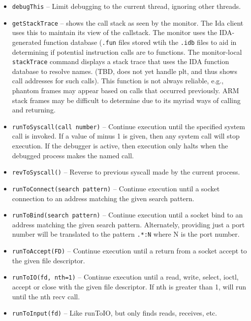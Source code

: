 \documentclass[titlepage]{article}
\begin{document}
\begin{itemize}
\item {\tt debugThis} -- Limit debugging to the current thread, ignoring other threads.

\item {\tt getStackTrace} – shows the call stack as seen by the monitor.  The Ida client uses this to maintain its view of the callstack.  The monitor
uses the IDA-generated function database ({\tt .fun} files stored wtih the {\tt .idb} files to aid in determining if 
potential instruction calls are to functions.  The monitor-local {\tt stackTrace} command displays a
stack trace that uses the IDA function database to resolve names.  (TBD, does not yet handle plt, and thus shows call addresses for such calls).
This function is not always reliable, e.g., phantom frames may appear based on calls that occurred previously. ARM stack frames may be
difficult to determine due to its myriad ways of calling and returning. 

\item {\tt runToSyscall(call number)} – Continue execution until the specified system call is invoked.  If a value of minus 1 is given, then any system call will stop execution.  If the debugger is active, then execution only halts when the debugged process makes the named call.

\item {\tt revToSyscall()} -- Reverse to previous syscall made by the current process.

\item {\tt runToConnect(search pattern)} – Continue execution until a socket connection to an address matching the given search pattern.

\item {\tt runToBind(search pattern)} – Continue execution until a socket bind to an address matching the given search pattern.  Alternately, providing just
a port number will be translated to the pattern {\tt .*:N} where N is the port number.

\item {\tt runToAccept(FD)} – Continue execution until a return from a socket accept to the given file descriptor.

\item {\tt runToIO(fd, nth=1)} – Continue execution until a read, write, select, ioctl, accept or close with the given file descriptor.  
If nth is greater than 1, will run until the nth recv call.  

\item {\tt runToInput(fd)} -- Like runToIO, but only finds reads, receives, etc.


\end{itemize}
\end{document}
